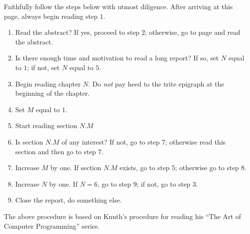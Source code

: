 \begin{preface}
  Faithfully follow the steps below with utmost diligence. After
  arriving at this page, always begin reading step 1.

 \begin{enumerate}
 \item Read the abstract? If yes, proceed to step 2; otherwise, go to
   page \pageref{combox-abstract} and read the abstract.
 \item Is there enough time and motivation to read a long report? If
   so, set $N$ equal to $1$; if not, set $N$ equal to $5$.
 \item Begin reading chapter $N$. Do \emph{not} pay heed to the trite
   epigraph at the beginning of the chapter.
 \item Set $M$ equal to $1$.
 \item Start reading section $N.M$
 \item Is section $N.M$ of any interest? If not, go to step 7;
   otherwise read this section and then go to step 7.
 \item Increase $M$ by one. If section $N.M$ exists, go to step 5;
   otherwise go to step 8.
 \item Increase $N$ by one. If $N = 6$, go to step 9; if not, go to
   step 3.
\item Close the report, do something else.
 \end{enumerate}

 The above procedure is based on Knuth's procedure for reading his
 ``The Art of Computer Programming'' series\cite{knuth}.
\end{preface}
